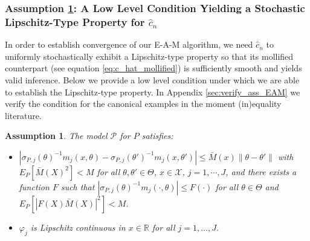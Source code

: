\documentclass[letterpaper,11pt]{article}
\theoremstyle{myplain}
\theoremstyle{mydefinition}
\newtheorem{assumption}{Assumption}[section]
\theoremstyle{myremark}
\newcommand{\cP}{\mathcal{P}}
\numberwithin{equation}{section}
\numberwithin{figure}{section}
\begin{document}
\begin{appendices}
\subsubsection{Assumption \ref{as:Lipschitz_m_over_sigma}: A Low Level Condition Yielding 
a Stochastic Lipschitz-Type Property for $\hat{c}_n$}
\label{app:as:Lipschitz}
In order to establish convergence of our E-A-M algorithm, we need $\hat{c}_n$ to uniformly  stochastically exhibit a Lipschitz-type property so that its mollified counterpart (see equation \eqref{eq:c_hat_mollified}) is sufficiently smooth and yields valid inference. Below we provide a low level condition under which we are able to establish the Lipschitz-type property. In Appendix \ref{sec:verify_ass_EAM} we verify the condition for the canonical examples in the moment (in)equality literature.
\begin{assumption}
\label{as:Lipschitz_m_over_sigma}
The model $\cP$ for $P$ satisfies: 
\begin{itemize}
	\item[(i)] $|\sigma_{P,j}(\theta)^{-1}m_j(x,\theta)-\sigma_{P,j}(\theta')^{-1}m_j(x,\theta')|\le \bar M(x)\|\theta-\theta'\|$ with $E_P[\bar M(X)^{2}]<M$  for all $\theta,\theta'\in\Theta$, $x\in\mathcal X$, $j=1,\cdots,J$, 
	 and there exists a function $F$ such that $|\sigma_{P,j}(\theta)^{-1}m_j(\cdot,\theta)|\le F(\cdot)$ for all $\theta\in\Theta$ 
	 and $E_P[|F(X)\bar M(X)|^2]<M$.
	
	\item[(ii)] $\varphi_j$ is Lipschitz continuous in $x\in\mathbb R$ for all $j=1,\dots,J.$
\end{itemize}
\end{assumption}


\end{appendices}
\end{document}
